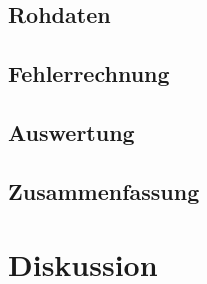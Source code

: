 \documentclass[12pt,a4paper]{article}
\begin{document}
\subsection*{Rohdaten}

\subsection*{Fehlerrechnung}

\subsection*{Auswertung}

\subsection*{Zusammenfassung}


\section*{Diskussion}
\end{document}
